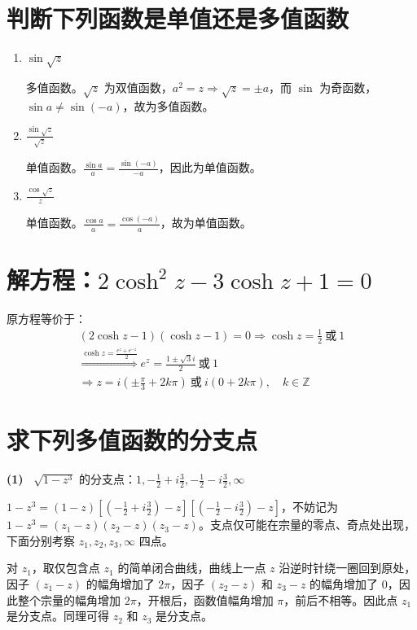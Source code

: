 \documentclass[UTF8]{report}
\def\Z{\mathbb{Z}}
\theoremstyle{MyLineTheoremStyle} %
\theoremstyle{MyBlockTheoremStyle} %
\theoremstyle{MySubsubsectionStyle} %
\begin{document}
\section{判断下列函数是单值还是多值函数}
\begin{enumerate}
\item $\sin \sqrt{z}$

多值函数。$\sqrt{z}$ 为双值函数，$a^2 = z \Longrightarrow  \sqrt{z} = \pm a $，而 $\sin $ 为奇函数，$\sin a \ne \sin (-a)$，故为多值函数。

\item $\frac{\sin \sqrt{z} }{\sqrt{z} }$

单值函数。$\frac{\sin a}{a} = \frac{\sin (-a)}{-a}$，因此为单值函数。

\item $\frac{\cos \sqrt{z} }{z }$

单值函数。$\frac{\cos a}{a} =\frac{\cos (-a)}{a}$，故为单值函数。
\end{enumerate}

\section{解方程：$2\cosh^2 z - 3\cosh z + 1 = 0$}
原方程等价于：
\begin{gather}
(2\cosh z - 1)(\cosh z - 1) = 0 \Longrightarrow  \cosh z = \frac{1}{2} \ \text{或}\  1 
\\ 
\overset{\cosh z = \frac{e^{z} + e^{-z}}{2}}{\Longrightarrow } 
e^z = \frac{1 \pm \sqrt{3}i }{2}\  \text{或}\ 1 
\\ 
\Longrightarrow
z = i(\pm \frac{\pi}{3} + 2k\pi) \ \text{或}\ i(0 + 2k\pi),\quad  k \in \Z
\end{gather}

\section{求下列多值函数的分支点}

\textbf{(1)\ } $\sqrt{1 - z^3}$ 的分支点：$1, -\frac{1}{2} + i\frac{3}{2}, -\frac{1}{2} - i\frac{3}{2}, \infty$

$1 - z^3 = (1-z)[(-\frac{1}{2} + i\frac{3}{2}) -z][(-\frac{1}{2} - i\frac{3}{2})-z]$，不妨记为 $1 - z^3 = (z_1 - z)(z_2 - z)(z_3 - z)$。支点仅可能在宗量的零点、奇点处出现，下面分别考察 $z_1,z_2,z_3, \infty$ 四点。

对 $z_1$，取仅包含点 $z_1$ 的简单闭合曲线，曲线上一点 $z$ 沿逆时针绕一圈回到原处，因子 $(z_1 - z)$ 的幅角增加了 $2\pi$，因子 $(z_2 - z)$ 和 $z_3 - z$ 的幅角增加了 0，因此整个宗量的幅角增加 $2\pi$，开根后，函数值幅角增加 $\pi$，前后不相等。因此点 $z_1$ 是分支点。同理可得 $z_2$ 和 $z_3 $ 是分支点。
\end{document}
